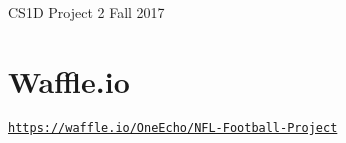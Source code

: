 C\+S1D Project 2 Fall 2017

\section*{Waffle.\+io}

\href{https://waffle.io/OneEcho/NFL-Football-Project}{\tt https\+://waffle.\+io/\+One\+Echo/\+N\+F\+L-\/\+Football-\/\+Project} 